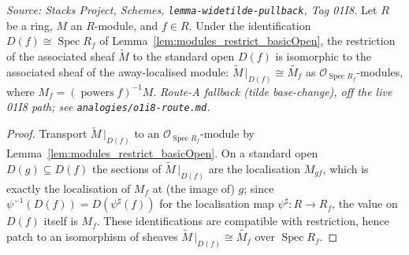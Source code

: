 \begin{lemma}
  \label{lem:tilde_restrict_basicOpen}
  \textit{Source: Stacks Project, Schemes, \texttt{lemma-widetilde-pullback}, Tag 01I8.}
  Let \(R\) be a ring, \(M\) an \(R\)-module, and \(f \in R\). Under the identification
  \(D(f) \cong \operatorname{Spec} R_f\) of Lemma~\ref{lem:modules_restrict_basicOpen}, the
  restriction of the associated sheaf \(\widetilde{M}\) to the standard open \(D(f)\) is
  isomorphic to the associated sheaf of the away-localised module:
  \(\widetilde{M}\,|_{D(f)} \cong \widetilde{M_f}\) as \(\mathcal{O}_{\operatorname{Spec}
  R_f}\)-modules, where \(M_f = (\operatorname{powers} f)^{-1} M\).
  \emph{Route-A fallback (tilde base-change), off the live 01I8 path; see
  \texttt{analogies/o1i8-route.md}.}
\end{lemma}
\begin{proof}
  Transport \(\widetilde{M}\,|_{D(f)}\) to an \(\mathcal{O}_{\operatorname{Spec}
  R_f}\)-module by Lemma~\ref{lem:modules_restrict_basicOpen}. On a standard open
  \(D(g) \subseteq D(f)\) the sections of \(\widetilde{M}\,|_{D(f)}\) are the localisation
  \(M_{gf}\), which is exactly the localisation of \(M_f\) at (the image of) \(g\); since
  \(\psi^{-1}(D(f)) = D(\psi^\sharp(f))\) for the localisation map \(\psi^\sharp : R \to R_f\),
  the value on \(D(f)\) itself is \(M_f\). These identifications are compatible with
  restriction, hence patch to an isomorphism of sheaves
  \(\widetilde{M}\,|_{D(f)} \cong \widetilde{M_f}\) over \(\operatorname{Spec} R_f\).
\end{proof}


